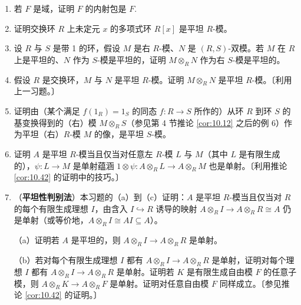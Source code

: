 \begin{enumerate}
\item 若 \(F\) 是域，证明 \(F\) 的内射包是 \(F\).

\item 证明交换环 \(R\) 上未定元 \(x\) 的多项式环 \(R[x]\) 是平坦 \(R\)-模。

\item 设 \(R\) 与 \(S\) 是带 1 的环，假设 \(M\) 是右 \(R\)-模、\(N\) 是 \((R, S)\)-双模。若 \(M\) 在 \(R\) 上是平坦的、\(N\) 作为 \(S\)-模是平坦的，证明 \(M \otimes_R N\) 作为右 \(S\)-模是平坦的。

\item 假设 \(R\) 是交换环，\(M\) 与 \(N\) 是平坦 \(R\)-模。证明 \(M \otimes_R N\) 是平坦 \(R\)-模。〔利用上一习题。〕

\item 证明由（某个满足 \(f(1_R) = 1_S\) 的同态 \(f : R \to S\) 所作的）从环 \(R\) 到环 \(S\) 的基变换得到的（右）模 \(M \otimes_R S\)（参见第 4 节推论 \ref{cor:10.12} 之后的例 6）作为平坦（右）\(R\)-模 \(M\) 的像，是平坦 \(S\)-模。

\item 证明 \(A\) 是平坦 \(R\)-模当且仅当对任意左 \(R\)-模 \(L\) 与 \(M\)（其中 \(L\) 是有限生成的），\(\psi : L \to M\) 是单射蕴涵 \(1 \otimes \psi : A \otimes_R L \to A \otimes_R M\) 也是单射。〔利用推论 \ref{cor:10.42} 的证明中的技巧。〕

\item （\textbf{平坦性判别法}）本习题的（a）到（c）证明：\(A\) 是平坦 \(R\)-模当且仅当对 \(R\) 的每个有限生成理想 \(I\)，由含入 \(I \hookrightarrow R\) 诱导的映射 \(A \otimes_R I \to A \otimes_R R \cong A\) 仍是单射（或等价地，\(A \otimes_R I \cong AI \subseteq A\)）。

（a）证明若 \(A\) 是平坦的，则 \(A \otimes_R I \to A \otimes_R R\) 是单射。

（b）若对每个有限生成理想 \(I\) 都有 \(A \otimes_R I \to A \otimes_R R\) 是单射，证明对每个理想 \(I\) 都有 \(A \otimes_R I \to A \otimes_R R\) 是单射。证明若 \(K\) 是有限生成自由模 \(F\) 的任意子模，则 \(A \otimes_R K \to A \otimes_R F\) 是单射。证明对任意自由模 \(F\) 同样成立。〔参见推论 \ref{cor:10.42} 的证明。〕


\end{enumerate}
